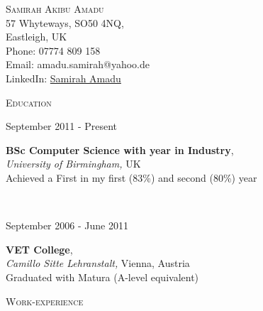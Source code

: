 \documentclass{article}
\newenvironment{changemargin}[2]{%
  \begin{list}{}{%
    \setlength{\topsep}{0pt}%
    \setlength{\leftmargin}{#1}%
    \setlength{\rightmargin}{#2}%
    \setlength{\listparindent}{\parindent}%
    \setlength{\itemindent}{\parindent}%
    \setlength{\parsep}{\parskip}%
  }%
  \item[]}{\end{list}
}
\newcommand{\header}[1]{
	\begin{changemargin}{-0.5in}{-0.5in}
		\large \textsc{#1}\\
		\vspace{-10pt}
		\raggedright
		\color{dark_grey}{\line(1,0){500}}
		\smallskip
	\end{changemargin}
}
\newcommand{\contact}[5]{
	\begin{changemargin}{-0.5in}{-0.5in}
			\raggedleft
			{\Large \scshape {#1}}\\ \smallskip
			{#2}\\ \smallskip 
			{#3}\\ \smallskip
			{#4}\\ \smallskip
			{#5}\bigskip
	\end{changemargin}
}
\newenvironment{body} {
	\vspace*{-16pt}
	\begin{changemargin}{0in}{0in}
  }	
	{
\end{changemargin}
\medskip
}
\newcommand{\para}[4]{
	\begin{minipage}[t]{0.55\linewidth}
	\textbf{#1},\\
	\textit{#2}
	#3\\
	#4
	\end{minipage}
}
\newcommand{\timerange}[1]{
	\begin{minipage}[t]{0.30\textwidth}
		#1
	\end{minipage}
}
\begin{document}
\contact{Samirah Akibu Amadu}{57 Whyteways, SO50 4NQ,\\ Eastleigh, UK}{Phone: 07774 809 158}{Email: amadu.samirah@yahoo.de}{LinkedIn: \href{http://uk.linkedin.com/pub/samirah-amadu/47/a8b/296/}{Samirah Amadu}}


\header{Education}

\begin{body}
	\vspace{14pt}
	\timerange{September 2011 -  Present}
	\para{BSc Computer Science with year in Industry}{University of Birmingham,}{UK\vspace{2pt}}{
		Achieved a First in my first (83\%) and second (80\%) year\\
	} \\

	\timerange{September 2006 - June 2011}
	\para{VET College}{Camillo Sitte Lehranstalt,}{Vienna, Austria}{
		Graduated with Matura (A-level equivalent)\\
	}

\end{body}

\header{Work-experience}
\end{document}
